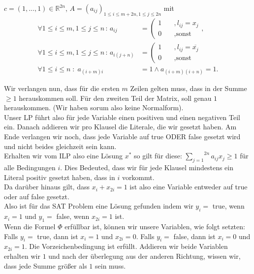 \documentclass[11pt,a4paper,ngerman]{article}
\begin{document}
$c = (1 , ... , 1) \in \mathbb{R}^{2n}$,
$A = (a_{ij})_{1 \leq i \leq m+2n, 1 \leq j \leq 2n}$
mit 
\begin{equation*}\begin{split}
\forall 1 \leq i \leq m, 1 \leq j \leq n \, : \, a_{ij} &= \left(\begin{array}{rl} 1 \quad &, l_{ij} = x_j \\ 0 &, \text{sonst}\end{array}\right. ,\\
\forall 1 \leq i \leq m, 1 \leq j \leq n \, : \, a_{i(j+n)} &= \left(\begin{array}{rl} 1 \quad &, l_{ij} = \overline{x_j} \\ 0 &, \text{sonst}\end{array}\right. \\
\forall 1 \leq i \leq n \; : \; a_{(i+m)i} &= 1 \land a_{(i+m)(i+n)} = 1.
\end{split}\end{equation*}

Wir verlangen nun, dass für die ersten $m$ Zeilen gelten muss, dass in der Summe $\geq 1$ herauskommen soll.
Für den zweiten Teil der Matrix, soll genau $1$ herauskommen. (Wir haben sorum also keine Normalform).\\

Unser LP führt also für jede Variable einen positiven und einen negativen Teil ein.
Danach addieren wir pro Klausel die Literale, die wir gesetzt haben.
Am Ende verlangen wir noch, dass jede Variable auf true ODER false gesetzt wird und nicht beides
gleichzeit sein kann.\\

Erhalten wir vom ILP also eine Lösung $x^*$ so gilt für diese:
$\overset{2n}{\underset{j=1}{\sum}} a_{ij}x_j \geq 1$ für alle Bedingungen $i$.
Dies Bedeuted, dass wir für jede Klausel mindestens ein Literal positiv gesetzt haben,
dass in $i$ vorkommt.\\
Da darüber hinaus gilt, dass $x_i + x_{2i} = 1$ ist also eine Variable entweder auf true oder auf false gesetzt.\\
Also ist für das SAT Problem eine Lösung gefunden indem wir $y_i =$ true, wenn $x_i = 1$ und $y_1 =$ false, wenn $x_{2i} = 1$ ist.\\

Wenn die Formel $\Phi$ erfüllbar ist, können wir unsere Variablen,
wie folgt setzten: Falls $y_i = $ true, dann ist $x_i = 1$ und $x_{2i} = 0$. Falls $y_i = $ false, dann ist $x_i = 0$ und $x_{2i} = 1$.
Die Vorzeichenbedingung ist erfüllt. Addieren wir beide Variablen erhalten wir $1$ und nach
der überlegung aus der anderen Richtung, wissen wir, dass jede Summe größer als $1$ sein muss.\\
\end{document}
